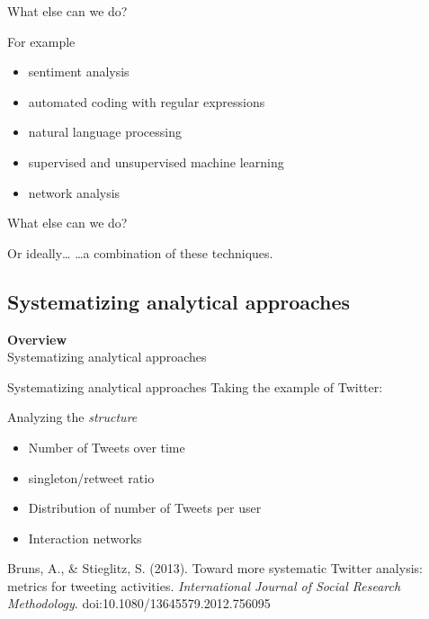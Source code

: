 \documentclass{beamer}
\begin{document}
\begin{frame}{What else can we do?}
\begin{block}{For example}
\begin{itemize}
\item sentiment analysis
\item automated coding with regular expressions
\item natural language processing
\item supervised and unsupervised machine learning
\item network analysis
\end{itemize}
\end{block}
\end{frame}

\begin{frame}{What else can we do?}
\begin{block}{Or ideally\ldots}
\ldots a combination of these techniques.
\end{block}
\end{frame}





\subsection{Systematizing analytical approaches}
\begin{frame}
\textbf{Overview}\\
Systematizing analytical approaches
\end{frame}

\begin{frame}{Systematizing analytical approaches}
Taking the example of Twitter:
\begin{block}{Analyzing the \emph{structure}}
\begin{itemize}
\item Number of Tweets over time
\item singleton/retweet ratio
\item Distribution of number of Tweets per user
\item Interaction networks
\end{itemize}
\end{block}
{\tiny Bruns, A., \& Stieglitz, S. (2013). Toward more systematic Twitter analysis: metrics for tweeting activities. \emph{International Journal of Social Research Methodology}. doi:10.1080/13645579.2012.756095\\ }
\end{frame}
\end{document}
